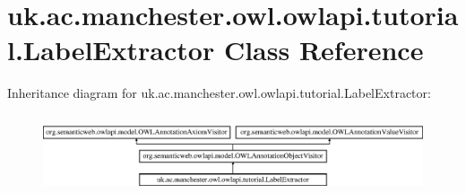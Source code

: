 \hypertarget{classuk_1_1ac_1_1manchester_1_1owl_1_1owlapi_1_1tutorial_1_1_label_extractor}{\section{uk.\-ac.\-manchester.\-owl.\-owlapi.\-tutorial.\-Label\-Extractor Class Reference}
\label{classuk_1_1ac_1_1manchester_1_1owl_1_1owlapi_1_1tutorial_1_1_label_extractor}
}
Inheritance diagram for uk.\-ac.\-manchester.\-owl.\-owlapi.\-tutorial.\-Label\-Extractor\-:\begin{figure}[H]
\begin{center}
\leavevmode
\includegraphics[height=2.352941cm]{classuk_1_1ac_1_1manchester_1_1owl_1_1owlapi_1_1tutorial_1_1_label_extractor}
\end{center}
\end{figure}
